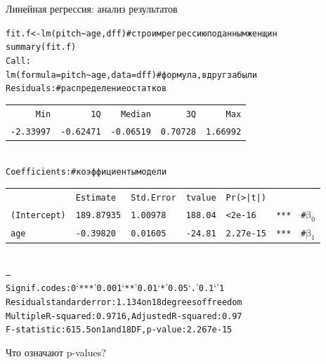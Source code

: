\begin{frame}{Линейная регрессия: анализ результатов}
\scriptsize
\begin{alltt}
fit.f <- \alert{lm(pitch\textasciitilde age, dff)} \hfill \# cтроим регрессию по данным женщин\\
\alert{summary(fit.f)}\bigskip\\
Call:\\
lm(formula = pitch \textasciitilde  age, data = dff)\hfill \# формула, вдруг забыли \bigskip\\
Residuals: \hfill \# распределение остатков\\
\begin{tabular}{rrrrr}
Min & 1Q & Median &3Q & Max \\
-2.33997 & -0.62471 & -0.06519  & 0.70728 &  1.66992  \\
\end{tabular}
\bigskip\\
Coefficients:\hfill \# коэффициенты модели\\
\begin{tabular}{llllllr}
					 	& Estimate		& Std. Error	& t value	&Pr(>|t|)	&  		& \\
(Intercept)		& 189.87935  &  1.00978 & 188.04  & < 2e-16 & *** 	& \alert{\# $\mbox{β}_0$}\\
age   				& -0.39820  &  0.01605 & -24.81 & 2.27e-15 &***	&  \alert{\# $\mbox{β}_1$}\\
\end{tabular}
\\
---\\
Signif. codes:  0 ‘***’ 0.001 ‘**’ 0.01 ‘*’ 0.05 ‘.’ 0.1 ‘ ’ 1\medskip\\
Residual standard error: 1.134 on 18 degrees of freedom\\
Multiple R-squared:  0.9716,	\alert{Adjusted R-squared:   0.97} \\
F-statistic: 615.5 on 1 and 18 DF,  p-value: 2.267e-15\\
\end{alltt}
\normalsize
\alert{Что означают p-values?}
\end{frame}

